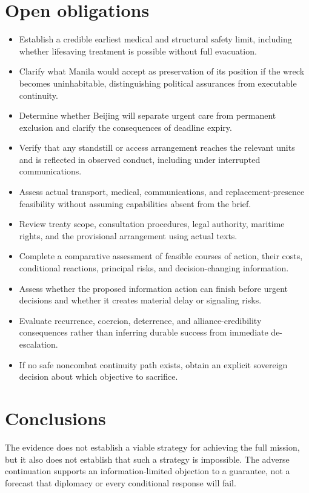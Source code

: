 \documentclass[11pt]{article}
\begin{document}
\section{Open obligations}
\begin{itemize}
\item Establish a credible earliest medical and structural safety limit, including whether lifesaving treatment is possible without full evacuation.
\item Clarify what Manila would accept as preservation of its position if the wreck becomes uninhabitable, distinguishing political assurances from executable continuity.
\item Determine whether Beijing will separate urgent care from permanent exclusion and clarify the consequences of deadline expiry.
\item Verify that any standstill or access arrangement reaches the relevant units and is reflected in observed conduct, including under interrupted communications.
\item Assess actual transport, medical, communications, and replacement-presence feasibility without assuming capabilities absent from the brief.
\item Review treaty scope, consultation procedures, legal authority, maritime rights, and the provisional arrangement using actual texts.
\item Complete a comparative assessment of feasible courses of action, their costs, conditional reactions, principal risks, and decision-changing information.
\item Assess whether the proposed information action can finish before urgent decisions and whether it creates material delay or signaling risks.
\item Evaluate recurrence, coercion, deterrence, and alliance-credibility consequences rather than inferring durable success from immediate de-escalation.
\item If no safe noncombat continuity path exists, obtain an explicit sovereign decision about which objective to sacrifice.
\end{itemize}
\section{Conclusions}
The evidence does not establish a viable strategy for achieving the full mission, but it also does not establish that such a strategy is impossible. The adverse continuation supports an information-limited objection to a guarantee, not a forecast that diplomacy or every conditional response will fail.
\end{document}
